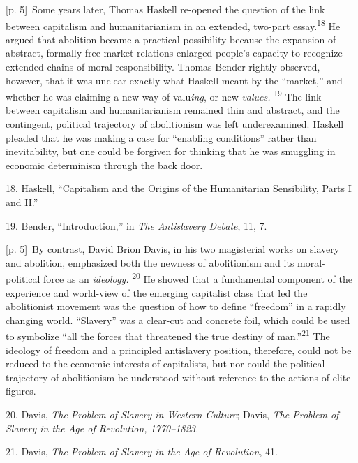 \documentclass[10pt,a4paper]{article}
\begin{document}
{\scriptsize\color{gray} [p. 5]}\ Some years later, Thomas Haskell re-opened the question of the link between capitalism and humanitarianism in an extended, two-part essay.\nobreak\textsuperscript{18} He argued that abolition became a practical possibility because the expansion of abstract, formally free market relations enlarged people’s capacity to recognize extended chains of moral responsibility. Thomas Bender rightly observed, however, that it was unclear exactly what Haskell meant by the “market,” and whether he was claiming a new way of valu\textit{ing}, or new \textit{values.} \nobreak\textsuperscript{19} The link between capitalism and humanitarianism remained thin and abstract, and the contingent, political trajectory of abolitionism was left underexamined. Haskell pleaded that he was making a case for “enabling conditions” rather than inevitability, but one could be forgiven for thinking that he was smuggling in economic determinism through the back door.\par{\small 18. Haskell, “Capitalism and the Origins of the Humanitarian Sensibility, Parts I and II.”\par}{\small 19. Bender, “Introduction,” in \textit{The Antislavery Debate}, 11, 7.\par}
{\scriptsize\color{gray} [p. 5]}\ By contrast, David Brion Davis, in his two magisterial works on slavery and abolition, emphasized both the newness of abolitionism and its moral-political force as an \textit{ideology.} \nobreak\textsuperscript{20} He showed that a fundamental component of the experience and world-view of the emerging capitalist class that led the abolitionist movement was the question of how to define “freedom” in a rapidly changing world. “Slavery” was a clear-cut and concrete foil, which could be used to symbolize “all the forces that threatened the true destiny of man.”\nobreak\textsuperscript{21} The ideology of freedom and a principled antislavery position, therefore, could not be reduced to the economic interests of capitalists, but nor could the political trajectory of abolitionism be understood without reference to the actions of elite figures.\par{\small 20. Davis, \textit{The Problem of Slavery in Western Culture}; Davis, \textit{The Problem of Slavery in the Age of Revolution, 1770–1823.}\par}{\small 21. Davis, \textit{The Problem of Slavery in the Age of Revolution}, 41.\par}
\end{document}
